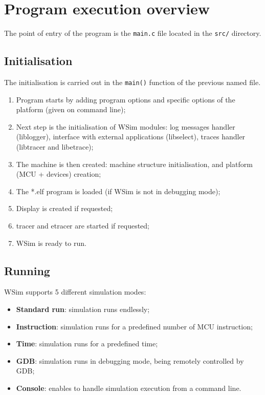 \documentclass[a4paper,10pt]{report}
\begin{document}
\chapter{Program execution overview}
\label{prog-exec}

The point of entry of the program is the \verb$main.c$ file located in
the \verb$src/$ directory.

\section{Initialisation}
The initialisation is carried out in the \verb$main()$ function of the
previous named file.

\begin{enumerate}
\item Program starts by adding program options and specific options of the platform (given on command line);     \item Next step is the initialisation of WSim modules: log messages handler (liblogger), interface with external applications (libselect), traces handler (libtracer and libetrace);
\item The machine is then created: machine structure initialisation, and platform (MCU + devices) creation;
\item The *.elf program is loaded (if WSim is not in debugging mode);
\item Display is created if requested;
\item tracer and etracer are started if requested;
\item WSim is ready to run.
\end{enumerate}

\section{Running}
WSim supports 5 different simulation modes:
\begin{itemize}
  \item \textbf{Standard run}: simulation runs endlessly;
  \item \textbf{Instruction}: simulation runs for a predefined number of MCU instruction;
  \item \textbf{Time}: simulation runs for a predefined time;
  \item \textbf{GDB}: simulation runs in debugging mode, being remotely controlled by GDB;
  \item \textbf{Console}: enables to handle simulation execution from a command line.
\end{itemize}
\end{document}
